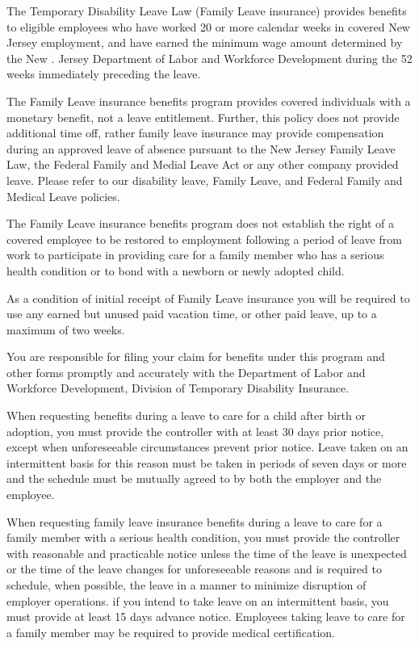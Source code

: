 The Temporary Disability Leave Law (Family Leave insurance) provides benefits to eligible employees who have worked 20 or more calendar weeks in covered New Jersey employment, and have earned the minimum wage amount determined by the New . Jersey Department of Labor and Workforce Development during the 52 weeks immediately preceding the leave.

The Family Leave insurance benefits program provides covered individuals with a monetary benefit, not a leave entitlement. Further, this policy does not provide additional time off, rather family leave insurance may provide compensation during an approved leave of absence pursuant to the New Jersey Family Leave Law, the Federal Family and Medial Leave Act or any other company provided leave. Please refer to our disability leave, Family Leave, and Federal Family and Medical Leave policies.

The Family Leave insurance benefits program does not establish the right of a covered employee to be restored to employment following a period of leave from work to participate in providing care for a family member who has a serious health condition or to bond with a newborn or newly adopted child.

As a condition of initial receipt of Family Leave insurance you will be required to use any earned but unused paid vacation time, or other paid leave, up to a maximum of two weeks.

You are responsible for filing your claim for benefits under this program and other forms promptly and accurately with the Department of Labor and Workforce Development, Division of Temporary Disability Insurance.

When requesting benefits during a leave to care for a child after birth or adoption, you must provide the controller with at least 30 days prior notice, except when unforeseeable circumstances prevent prior notice. Leave taken on an intermittent basis for this reason must be taken in periods of seven days or more and the schedule must be mutually agreed to by both the employer and the employee.

When requesting family leave insurance benefits during a leave to care for a family member with a serious health condition, you must provide the controller with reasonable and practicable notice unless the time of the leave is unexpected or the time of the leave changes for unforeseeable reasons and is required to schedule, when possible, the leave in a manner to minimize disruption of employer operations. if you intend to take leave on an intermittent basis, you must provide at least 15 days advance notice. Employees taking leave to care for a family member may be required to provide medical certification.

